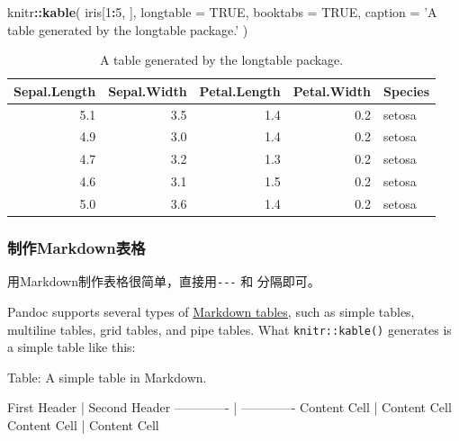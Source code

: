 \documentclass[]{article}
\newenvironment{Shaded}{\begin{snugshade}}{\end{snugshade}}
\newcommand{\DataTypeTok}[1]{\textcolor[rgb]{0.13,0.29,0.53}{#1}}
\newcommand{\DecValTok}[1]{\textcolor[rgb]{0.00,0.00,0.81}{#1}}
\newcommand{\KeywordTok}[1]{\textcolor[rgb]{0.13,0.29,0.53}{\textbf{#1}}}
\newcommand{\NormalTok}[1]{#1}
\newcommand{\OperatorTok}[1]{\textcolor[rgb]{0.81,0.36,0.00}{\textbf{#1}}}
\newcommand{\OtherTok}[1]{\textcolor[rgb]{0.56,0.35,0.01}{#1}}
\newcommand{\StringTok}[1]{\textcolor[rgb]{0.31,0.60,0.02}{#1}}
\begin{document}
\begin{Shaded}
\begin{Highlighting}[]
\NormalTok{knitr}\OperatorTok{::}\KeywordTok{kable}\NormalTok{(}
\NormalTok{  iris[}\DecValTok{1}\OperatorTok{:}\DecValTok{5}\NormalTok{, ], }\DataTypeTok{longtable =} \OtherTok{TRUE}\NormalTok{, }\DataTypeTok{booktabs =} \OtherTok{TRUE}\NormalTok{,}
  \DataTypeTok{caption =} \StringTok{'A table generated by the longtable package.'}
\NormalTok{)}
\end{Highlighting}
\end{Shaded}

\begin{longtable}[t]{rrrrl}
\caption{\label{tab:longtable}A table generated by the longtable package.}\\
\toprule
Sepal.Length & Sepal.Width & Petal.Length & Petal.Width & Species\\
\midrule
5.1 & 3.5 & 1.4 & 0.2 & setosa\\
4.9 & 3.0 & 1.4 & 0.2 & setosa\\
4.7 & 3.2 & 1.3 & 0.2 & setosa\\
4.6 & 3.1 & 1.5 & 0.2 & setosa\\
5.0 & 3.6 & 1.4 & 0.2 & setosa\\
\bottomrule
\end{longtable}

\hypertarget{markdown}{%
\subsubsection{制作Markdown表格}\label{markdown}}

用Markdown制作表格很简单，直接用\texttt{-\/-\/-} 和
\texttt{\textbar{}}分隔即可。

Pandoc supports several types of
\href{http://pandoc.org/MANUAL.html\#tables}{Markdown tables,} such as
simple tables, multiline tables, grid tables, and pipe tables. What
\texttt{knitr::kable()} generates is a simple table like this:

\begin{Shaded}
\begin{Highlighting}[]
\NormalTok{Table: A simple table in Markdown.}

\NormalTok{ First Header | Second Header}
\NormalTok{------------- | -------------}
\NormalTok{Content Cell  | Content Cell}
\NormalTok{Content Cell  | Content Cell}
\end{Highlighting}
\end{Shaded}
\end{document}
